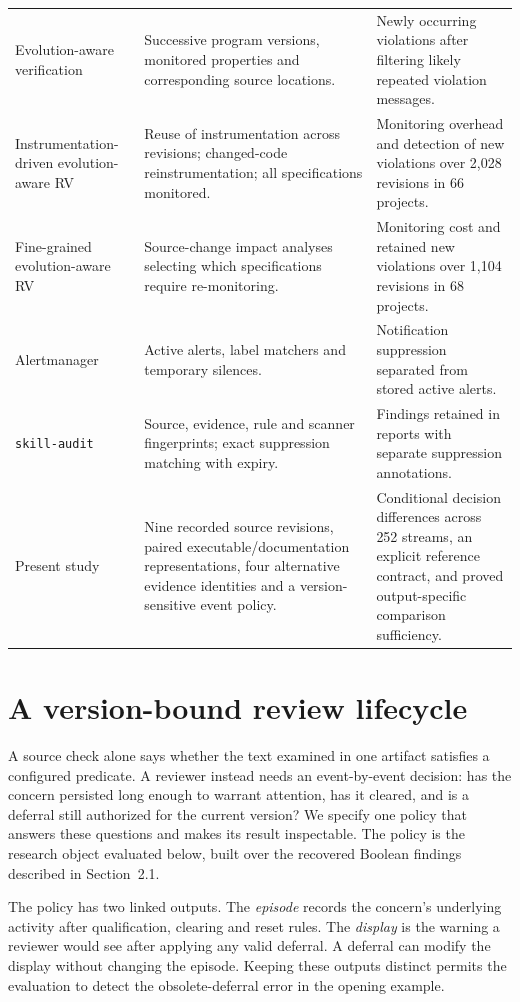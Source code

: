 \documentclass[preprint,11pt]{elsarticle}
\newcommand{\code}[1]{\texttt{#1}}
\begin{document}
{\begin{longtable}{@{}>{\raggedright\arraybackslash}p{.235\linewidth}>{\raggedright\arraybackslash}p{.38\linewidth}>{\raggedright\arraybackslash}p{}@{}}
Evolution-aware verification \cite{legunsen2019evolution} & Successive program versions, monitored properties and corresponding source locations. & Newly occurring violations after filtering likely repeated violation messages. \\
Instrumentation-driven evolution-aware RV \cite{guan2025imop} & Reuse of instrumentation across revisions; changed-code reinstrumentation; all specifications monitored. & Monitoring overhead and detection of new violations over 2,028 revisions in 66 projects. \\
Fine-grained evolution-aware RV \cite{jiang2026finemop} & Source-change impact analyses selecting which specifications require re-monitoring. & Monitoring cost and retained new violations over 1,104 revisions in 68 projects. \\
Alertmanager \cite{prometheus2026alertmanager} & Active alerts, label matchers and temporary silences. & Notification suppression separated from stored active alerts. \\
\code{skill-audit} \cite{skillaudit2026suppression} & Source, evidence, rule and scanner fingerprints; exact suppression matching with expiry. & Findings retained in reports with separate suppression annotations. \\
Present study & Nine recorded source revisions, paired executable/documentation representations, four alternative evidence identities and a version-sensitive event policy. & Conditional decision differences across 252 streams, an explicit reference contract, and proved output-specific comparison sufficiency. \\
\end{longtable}
}

\section{A version-bound review lifecycle}
A source check alone says whether the text examined in one artifact satisfies a configured predicate. A reviewer instead needs an event-by-event decision: has the concern persisted long enough to warrant attention, has it cleared, and is a deferral still authorized for the current version? We specify one policy that answers these questions and makes its result inspectable. The policy is the research object evaluated below, built over the recovered Boolean findings described in Section~2.1.

The policy has two linked outputs. The \emph{episode} records the concern's underlying activity after qualification, clearing and reset rules. The \emph{display} is the warning a reviewer would see after applying any valid deferral. A deferral can modify the display without changing the episode. Keeping these outputs distinct permits the evaluation to detect the obsolete-deferral error in the opening example.
\end{document}
